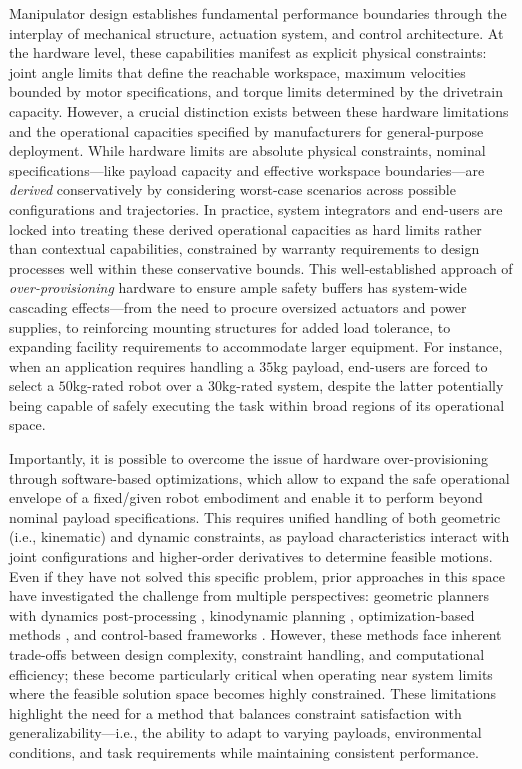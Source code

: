 Manipulator design establishes fundamental performance boundaries through the interplay of mechanical structure, actuation system, and control architecture.
At the hardware level, these capabilities manifest as explicit physical constraints: joint angle limits that define the reachable workspace, maximum velocities bounded by motor specifications, and torque limits determined by the drivetrain capacity.
However, a crucial distinction exists between these hardware limitations and the operational capacities specified by manufacturers for general-purpose deployment.
While hardware limits are absolute physical constraints, nominal specifications---like payload capacity and effective workspace boundaries---are \textit{derived} conservatively by considering worst-case scenarios across possible configurations and trajectories.
In practice, system integrators and end-users are locked into treating these derived operational capacities as hard limits rather than contextual capabilities, constrained by warranty requirements to design processes well within these conservative bounds.
This well-established approach of \textit{over-provisioning} hardware to ensure ample safety buffers has system-wide cascading effects---from the need to procure oversized actuators and power supplies, to reinforcing mounting structures for added load tolerance, to expanding facility requirements to accommodate larger equipment.
For instance, when an application requires handling a $35$kg payload, end-users are forced to select a $50$kg-rated robot over a $30$kg-rated system, despite the latter potentially being capable of safely executing the task within broad regions of its operational space.

Importantly, it is possible to overcome the issue of hardware over-provisioning through software-based optimizations, which allow to expand the safe operational envelope of a fixed/given robot embodiment and enable it to perform beyond nominal payload specifications.
This requires unified handling of both geometric (i.e., kinematic) and dynamic constraints, as payload characteristics interact with joint configurations and higher-order derivatives to determine feasible motions.
Even if they have not solved this specific problem, prior approaches in this space have investigated the challenge from multiple perspectives: geometric planners with dynamics post-processing \cite{orthey2023sampling,berscheid2021jerk}, kinodynamic planning \cite{shome2021asymptotically}, optimization-based methods \cite{ichnowski2022gomp}, and control-based frameworks \cite{arrizabalaga2024slosh}. However, these methods face inherent trade-offs between design complexity, constraint handling, and computational efficiency; these become particularly critical when operating near system limits where the feasible solution space becomes highly constrained.
These limitations highlight the need for a method that balances constraint satisfaction with
generalizability---i.e., the ability to adapt to varying payloads, environmental conditions, and task requirements while maintaining consistent performance.

